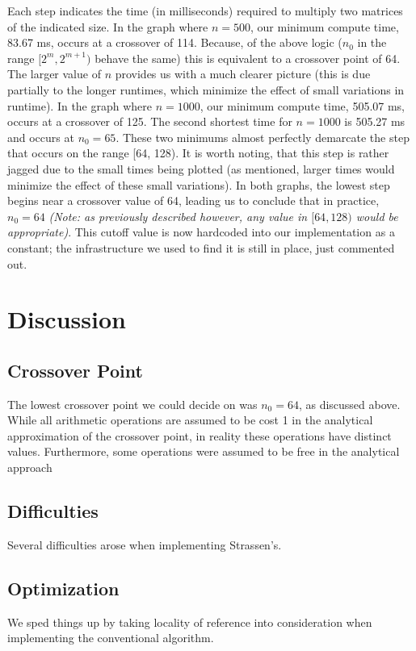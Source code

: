 \documentclass[solution, letterpaper]{cs121}
\begin{document}
Each step indicates the time (in milliseconds) required to multiply two matrices of the indicated size. In the graph where $n=500$, our minimum compute time, 83.67 ms, occurs at a crossover of 114. Because, of the above logic ($n_0$ in the range $[2^m,2^{m+1})$ behave the same) this is equivalent to a crossover point of 64. The larger value of $n$ provides us with a much clearer picture (this is due partially to the longer runtimes, which minimize the effect of small variations in runtime). In the graph where $n=1000$, our minimum compute time, 505.07 ms, occurs at a crossover of 125. The second shortest time for $n = 1000$ is 505.27 ms and occurs at $n_0 = 65$. These two minimums almost perfectly demarcate the step that occurs on the range [64, 128). It is worth noting, that this step is rather jagged due to the small times being plotted (as mentioned, larger times would minimize the effect of these small variations). In both graphs, the lowest step begins near a crossover value of 64, leading us to conclude that in practice, $n_0 = 64$ \textit{(Note: as previously described however, any value in $[64,128)$ would be appropriate)}. This cutoff value is now hardcoded into our implementation as a constant; the infrastructure we used to find it is still in place, just commented out.

\section*{Discussion}

\subsection*{Crossover Point}
The lowest crossover point we could decide on was $n_0 = 64$, as discussed above. While all arithmetic operations are assumed to be cost 1 in the analytical approximation of the crossover point, in reality these operations have distinct values. Furthermore, some operations were assumed to be free in the analytical approach

\subsection*{Difficulties}
Several difficulties arose when implementing Strassen's.

\subsection*{Optimization}
We sped things up by taking locality of reference into consideration when implementing the conventional algorithm. 
\end{document}
